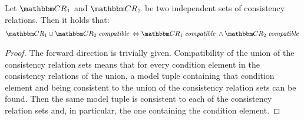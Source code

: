 \begin{theorem} \label{theorem:independencecompatibility}
    Let $\consistencyrelationset{CR}_{1}$ and $\consistencyrelationset{CR}_{2}$ be two independent sets of consistency relations. Then it holds that:
    \begin{align*}
        \consistencyrelationset{CR}_{1} \cup \consistencyrelationset{CR}_{2} \compatiblemath \equivalent \consistencyrelationset{CR}_{1} \compatiblemath \land \consistencyrelationset{CR}_{2} \compatiblemath
    \end{align*}
\end{theorem}
\begin{proof}
    The forward direction is trivially given. 
    Compatibility of the union of the consistency relation sets means that for every condition element in the consistency relations of the union, a model tuple containing that condition element and being consistent to the union of the consistency relation sets can be found. Then the same model tuple is consistent to each of the consistency relation sets and, in particular, the one containing the condition element.


\end{proof}
